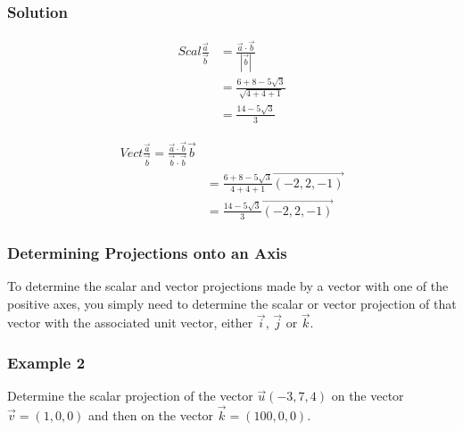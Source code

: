\documentclass{article}
\begin{document}
\subsubsection*{Solution }

\begin{minipage}{0.45\textwidth}
\begin{align*}
    Scal\frac{\vec{a}}{\vec{b}}&=\frac{\vec{a}\cdot\vec{b}}{|\vec{b}|}\\
    &=\frac{6+8-5\sqrt{3}}{\sqrt{4+4+1}}\\
    &=\frac{14-5\sqrt{3}}{3}
\end{align*}
\end{minipage}
\begin{minipage}{0.45\textwidth}
\begin{align*}
    Vect\frac{\vec{a}}{\vec{b}}=\frac{\vec{a}\cdot \vec{b}}{\vec{b}\cdot\vec{b}}\vec{b}\\
    &=\frac{6+8-5\sqrt{3}}{4+4+1}\overrightarrow{(-2,2,-1)}\\
    &=\frac{14-5\sqrt{3}}{3}\overrightarrow{(-2,2,-1)}
\end{align*}
\end{minipage}

\subsubsection{Determining Projections onto an Axis}
To determine the scalar and vector projections made by a vector with one of the positive axes, you simply need to determine the scalar or vector projection of that vector with the associated unit vector, either $\vec{i}$, $\vec{j}$ or $\vec{k}$.  
\subsubsection*{Example 2}
Determine the scalar projection of the vector $\vec{u}(-3,7,4)$ on the vector $\vec{v}=(1,0,0)$ and then on the vector $\vec{k}=(100,0,0)$.
\end{document}
